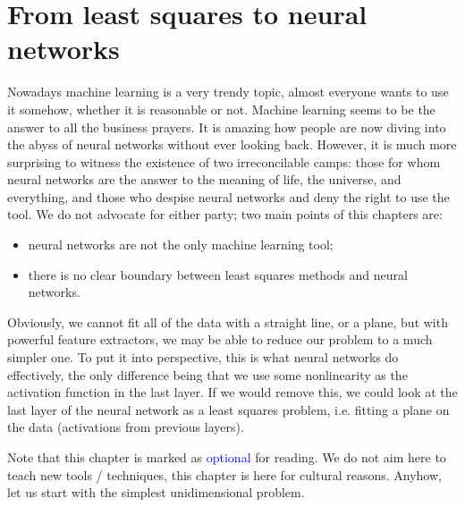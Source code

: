 \documentclass[notitlepage,oneside]{book}
\begin{document}
\chapter{From least squares to neural networks}

Nowadays machine learning is a very trendy topic, almost everyone wants to use it somehow, whether it is reasonable or not.
Machine learning seems to be the answer to all the business prayers.
It is amazing how people are now diving into the abyss of neural networks without ever looking back.
However, it is much more surprising to witness the existence of two irreconcilable camps: those for whom neural networks are the answer
to the meaning of life, the universe, and everything, and those who despise neural networks and deny the right to use the tool.
We do not advocate for either party; two main points of this chapters are:
\begin{itemize}
\item neural networks are not the only machine learning tool;
\item there is no clear boundary between least squares methods and neural networks.
\end{itemize}

Obviously, we cannot fit all of the data with a straight line, or a plane, but with powerful feature extractors, we may be able to reduce our problem to a much simpler one.
To put it into perspective, this is what neural networks do effectively, the only difference being that we use some nonlinearity as the activation function in the last layer.
If we would remove this, we could look at the last layer of the neural network as a least squares problem, i.e. fitting a plane on the data (activations from previous layers).

Note that this chapter is marked as \textcolor{blue}{optional} for reading.
We do not aim here to teach new tools / techniques, this chapter is here for cultural reasons.
Anyhow, let us start with the simplest unidimensional problem.
\end{document}
